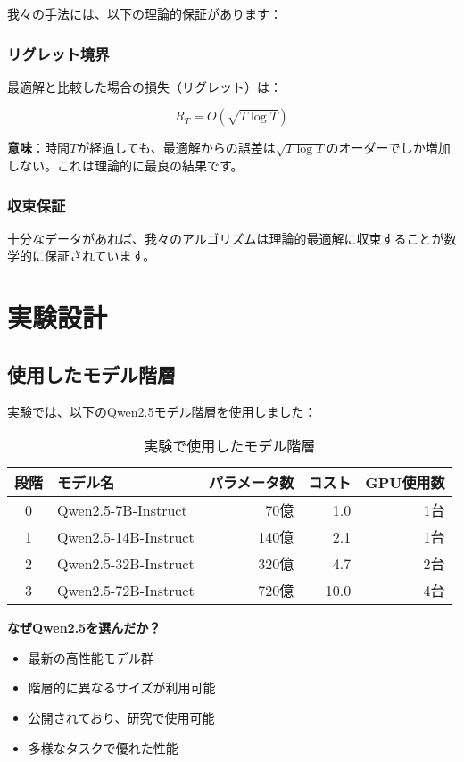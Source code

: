 \documentclass[a4paper,12pt]{jsarticle}
\begin{document}
我々の手法には、以下の理論的保証があります：

\subsubsection{リグレット境界}

最適解と比較した場合の損失（リグレット）は：

\begin{equation}
R_T = O(\sqrt{T \log T})
\end{equation}

\textbf{意味}：時間$T$が経過しても、最適解からの誤差は$\sqrt{T \log T}$のオーダーでしか増加しない。これは理論的に最良の結果です。

\subsubsection{収束保証}

十分なデータがあれば、我々のアルゴリズムは理論的最適解に収束することが数学的に保証されています。

\section{実験設計}

\subsection{使用したモデル階層}

実験では、以下のQwen2.5モデル階層を使用しました：

\begin{table}[H]
\centering
\caption{実験で使用したモデル階層}
\begin{tabular}{|c|l|r|r|r|}
\hline
\textbf{段階} & \textbf{モデル名} & \textbf{パラメータ数} & \textbf{コスト} & \textbf{GPU使用数} \\
\hline
0 & Qwen2.5-7B-Instruct & 70億 & 1.0 & 1台 \\
1 & Qwen2.5-14B-Instruct & 140億 & 2.1 & 1台 \\
2 & Qwen2.5-32B-Instruct & 320億 & 4.7 & 2台 \\
3 & Qwen2.5-72B-Instruct & 720億 & 10.0 & 4台 \\
\hline
\end{tabular}
\end{table}

\textbf{なぜQwen2.5を選んだか？}
\begin{itemize}
\item 最新の高性能モデル群
\item 階層的に異なるサイズが利用可能
\item 公開されており、研究で使用可能
\item 多様なタスクで優れた性能
\end{itemize}
\end{document}
